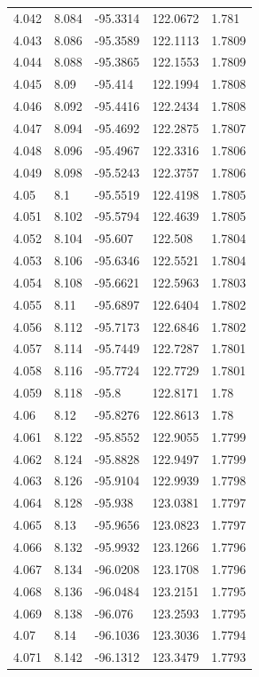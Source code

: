 \begin{tabular}{lllll}
4.042 & 8.084 & -95.3314 & 122.0672 & 1.781 \\
4.043 & 8.086 & -95.3589 & 122.1113 & 1.7809 \\
4.044 & 8.088 & -95.3865 & 122.1553 & 1.7809 \\
4.045 & 8.09 & -95.414 & 122.1994 & 1.7808 \\
4.046 & 8.092 & -95.4416 & 122.2434 & 1.7808 \\
4.047 & 8.094 & -95.4692 & 122.2875 & 1.7807 \\
4.048 & 8.096 & -95.4967 & 122.3316 & 1.7806 \\
4.049 & 8.098 & -95.5243 & 122.3757 & 1.7806 \\
4.05 & 8.1 & -95.5519 & 122.4198 & 1.7805 \\
4.051 & 8.102 & -95.5794 & 122.4639 & 1.7805 \\
4.052 & 8.104 & -95.607 & 122.508 & 1.7804 \\
4.053 & 8.106 & -95.6346 & 122.5521 & 1.7804 \\
4.054 & 8.108 & -95.6621 & 122.5963 & 1.7803 \\
4.055 & 8.11 & -95.6897 & 122.6404 & 1.7802 \\
4.056 & 8.112 & -95.7173 & 122.6846 & 1.7802 \\
4.057 & 8.114 & -95.7449 & 122.7287 & 1.7801 \\
4.058 & 8.116 & -95.7724 & 122.7729 & 1.7801 \\
4.059 & 8.118 & -95.8 & 122.8171 & 1.78 \\
4.06 & 8.12 & -95.8276 & 122.8613 & 1.78 \\
4.061 & 8.122 & -95.8552 & 122.9055 & 1.7799 \\
4.062 & 8.124 & -95.8828 & 122.9497 & 1.7799 \\
4.063 & 8.126 & -95.9104 & 122.9939 & 1.7798 \\
4.064 & 8.128 & -95.938 & 123.0381 & 1.7797 \\
4.065 & 8.13 & -95.9656 & 123.0823 & 1.7797 \\
4.066 & 8.132 & -95.9932 & 123.1266 & 1.7796 \\
4.067 & 8.134 & -96.0208 & 123.1708 & 1.7796 \\
4.068 & 8.136 & -96.0484 & 123.2151 & 1.7795 \\
4.069 & 8.138 & -96.076 & 123.2593 & 1.7795 \\
4.07 & 8.14 & -96.1036 & 123.3036 & 1.7794 \\
4.071 & 8.142 & -96.1312 & 123.3479 & 1.7793 \\

\end{tabular}
